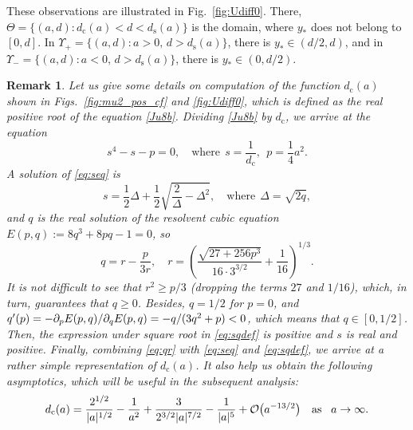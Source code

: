 \documentclass[oneside,a4paper,11pt]{article}
\theoremstyle{thmstyletwo}%
\newtheorem{remark}[theorem]{Remark}
\theoremstyle{thmstylethree}%
\numberwithin{equation}{section}
\newcommand{\pd}[2][]{
\if\relax#1\relax
 \partial_{#2}%
\else
 \partial_{#2}^{#1}%
\fi}
\def\dcrit{d_{\textrm{c}}}
\def\ds{d_{\textrm{s}}}
\def\Obig{\mathcal{O}}
\begin{document}
These observations are illustrated in Fig.~\ref{fig:Udiff0}. There, $\Theta=\{(a,d): \dcrit(a)<d<\ds(a)\}$ is the domain, where $y_*$  does not belong to $[0,d]$. In $\Upsilon_+=\{(a,d): {a>0},\,d>\ds(a)\}$, there is  $y_*\in(d/2,d)$, and
in $\Upsilon_-=\{(a,d):a<0,\,d>\ds(a)\}$, there is $y_*\in(0,d/2)$.

\begin{remark}
Let us give some details on computation of the function $\dcrit(a)$ shown in Figs.~\ref{fig:mu2_pos_cf} and \ref{fig:Udiff0}, which is defined as the real positive root of the equation \eqref{Ju8b}. Dividing \eqref{Ju8b} by $\dcrit$, we arrive at the equation
\begin{equation}
s^4-s-p=0,\quad\mbox{where}\ \ s=\frac{1}{\dcrit},\ \ p=\frac14a^2.\label{eq:seq}
\end{equation}
A solution of \eqref{eq:seq} is
\begin{equation}
s=\frac12\Delta+\frac12\sqrt{\frac{2}{\Delta}-\Delta^2},\quad \mbox{where}\ \ \Delta=\sqrt{2q},
\label{eq:sqdef}
\end{equation}
and $q$ is the real solution of the resolvent cubic equation $E(p,q):=8q^3+8p q-1=0$, so
\begin{equation}
q=r-\frac{p}{3r},\quad r=\left(\frac{\sqrt{27+256p^3}}{16\cdot3^{3/2}}+\frac{1}{16}\right)^{\!1/3}.
\label{eq:qr}
\end{equation}
It is not difficult to see that $r^2\geq p/3$ (dropping the terms $27$ and $1/16$), which, in turn, guarantees that $q\geq 0$. Besides, $q=1/2$ for $p=0$, and $q'(p)=-\pd{p}E(p,q)/\pd{q}E(p,q)=-q/(3q^2+p)<0$, which means that $q\in[0,1/2]$. Then, the expression under square root in \eqref{eq:sqdef} is positive and $s$ is real and positive. Finally, combining \eqref{eq:qr} with \eqref{eq:seq} and \eqref{eq:sqdef}, we arrive at a rather simple representation of $\dcrit(a)$. It also help us obtain the following asymptotics, which will be useful in the subsequent analysis:
\begin{equation}
\dcrit(a) = \frac{2^{1/2}}{|a|^{1/2}} - \frac{1}{a^2} + \frac{3}{2^{3/2}|a|^{7/2}}-\frac{1}{|a|^5}
+\Obig\bigl(a^{-13/2}\bigr)\quad\mbox{as\!}\quad a\to\infty.
\label{eq:dcritasympt}
\end{equation}
\end{remark}

\end{document}

